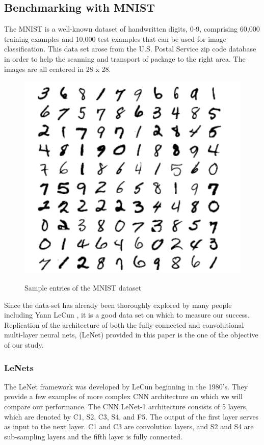 \documentclass[12pt, twocolumn]{article}
\begin{document}
\subsection{Benchmarking with MNIST}


The MNIST is a well-known dataset of handwritten digits, 0-9, comprising 60,000 training examples and 10,000 test examples \cite{MNIST}  that can be used for image classification.  This data set arose from the U.S. Postal Service zip code database in order to help the scanning and transport of package to the right area. The images are all centered in 28 x 28.

\begin{figure}
\includegraphics[scale=.8]{MNISTnos.png}
\label{fig:MNISTex}
\caption{Sample entries of the MNIST dataset \cite{LeCun1998}}
\end{figure}

Since the data-set has already been thoroughly explored  by many people including Yann LeCun \cite{LeCun1998}, it is a good data set on which to measure our success.  Replication of the architecture of both the fully-connected and convolutional multi-layer neural nets, (LeNet) provided in this paper is the one of the objective of our study. 

\subsubsection{LeNets}
The LeNet framework was developed by LeCun beginning in the 1980's. They provide a few examples of more complex CNN architecture on which we will compare our performance. 
The CNN LeNet-1 architecture consists of 5 layers, which are denoted by C1, S2, C3, S4, and F5.  The output of the first layer serves as
input to the next layer. C1 and C3 are convolution layers, and S2 and S4 are sub-sampling layers and the fifth layer is fully connected. \cite{LeCun89}
\end{document}

